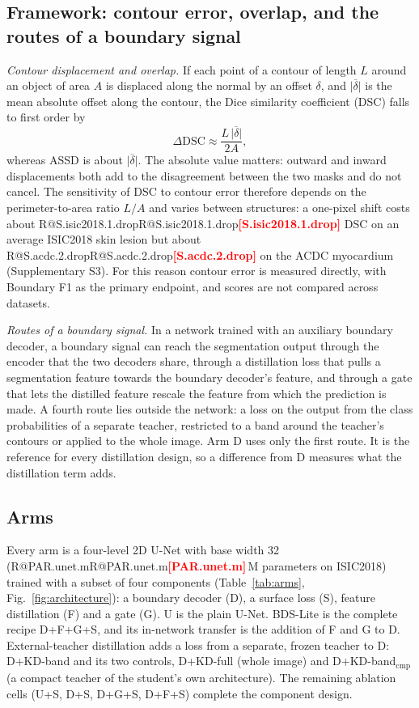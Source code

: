 \documentclass[fleqn,10pt,lineno]{wlpeerj}
\makeatletter
\newcommand{\R}[1]{\ifcsname R@#1\endcsname\csname R@#1\endcsname\else\textbf{\textcolor{red}{[#1]}}\fi}
\makeatother
\begin{document}
\subsection*{Framework: contour error, overlap, and the routes of a boundary signal}
\emph{Contour displacement and overlap.} If each point of a contour of length $L$ around an object of area $A$ is displaced along the normal by an offset $\delta$, and $\overline{|\delta|}$ is the mean absolute offset along the contour, the Dice similarity coefficient (DSC) falls to first order by
\begin{equation}
\Delta\mathrm{DSC}\approx\frac{L\,\overline{|\delta|}}{2A},
\label{eq:dsc}
\end{equation}
whereas ASSD is about $\overline{|\delta|}$. The absolute value matters: outward and inward displacements both add to the disagreement between the two masks and do not cancel. The sensitivity of DSC to contour error therefore depends on the perimeter-to-area ratio $L/A$ and varies between structures: a one-pixel shift costs about \R{S.isic2018.1.drop} DSC on an average ISIC2018 skin lesion but about \R{S.acdc.2.drop} on the ACDC myocardium (Supplementary S3). For this reason contour error is measured directly, with Boundary F1 as the primary endpoint, and scores are not compared across datasets.

\emph{Routes of a boundary signal.} In a network trained with an auxiliary boundary decoder, a boundary signal can reach the segmentation output through the encoder that the two decoders share, through a distillation loss that pulls a segmentation feature towards the boundary decoder's feature, and through a gate that lets the distilled feature rescale the feature from which the prediction is made. A fourth route lies outside the network: a loss on the output from the class probabilities of a separate teacher, restricted to a band around the teacher's contours or applied to the whole image. Arm D uses only the first route. It is the reference for every distillation design, so a difference from D measures what the distillation term adds.

\subsection*{Arms}
Every arm is a four-level 2D U-Net \citep{Ronneberger2015UNet} with base width 32 (\R{PAR.unet.m}\,M parameters on ISIC2018) trained with a subset of four components (Table~\ref{tab:arms}, Fig.~\ref{fig:architecture}): a boundary decoder (D), a surface loss (S), feature distillation (F) and a gate (G). U is the plain U-Net. BDS-Lite is the complete recipe D+F+G+S, and its in-network transfer is the addition of F and G to D. External-teacher distillation adds a loss from a separate, frozen teacher to D: D+KD-band and its two controls, D+KD-full (whole image) and D+KD-band$_{\mathrm{cmp}}$ (a compact teacher of the student's own architecture). The remaining ablation cells (U+S, D+S, D+G+S, D+F+S) complete the component design.
\end{document}
